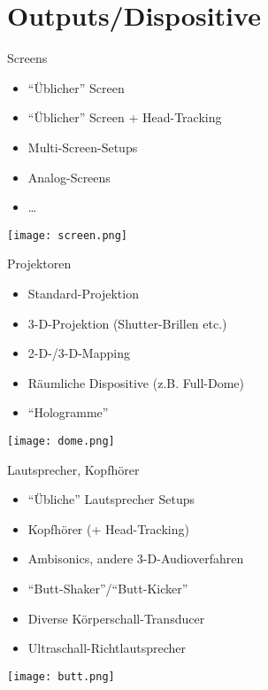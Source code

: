 \section{Outputs/Dispositive}
 \frame{\sectionpage}

\begin{frame}{Screens}

\begin{itemize}
	\item "`Üblicher"' Screen
	\item "`Üblicher"' Screen + Head-Tracking
	\item Multi-Screen-Setups
	\item Analog-Screens
	\item \dots{}

\end{itemize}

\begin{center}
\texttt{[image: screen.png]}
\end{center}




\end{frame}


\begin{frame}{Projektoren}
\begin{itemize}
	\item Standard-Projektion
	\item 3-D-Projektion (Shutter-Brillen etc.)
	\item 2-D-/3-D-Mapping
	\item Räumliche Dispositive (z.B. Full-Dome)
	\item "`Hologramme"'
\end{itemize}

\begin{center}
\texttt{[image: dome.png]}
\end{center}
\end{frame}


\begin{frame}{Lautsprecher, Kopfhörer}
\begin{itemize}
	\item "`Übliche"' Lautsprecher Setups
	\item Kopfhörer (+ Head-Tracking)
	\item Ambisonics, andere 3-D-Audioverfahren
	\item "`Butt-Shaker"'/"`Butt-Kicker"'
	\item Diverse Körperschall-Transducer
	\item Ultraschall-Richtlautsprecher
\end{itemize}

\begin{center}
\texttt{[image: butt.png]}
\end{center}

\end{frame}

